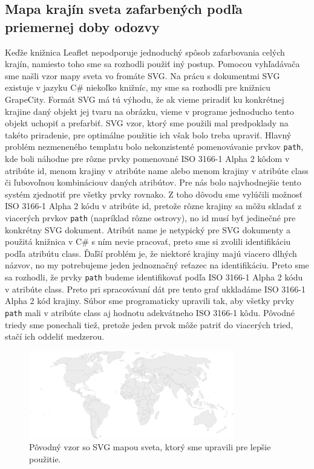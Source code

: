 \subsection{Mapa krajín sveta zafarbených podľa priemernej doby odozvy}
Keďže knižnica Leaflet nepodporuje jednoduchý spôsob zafarbovania celých krajín, namiesto toho sme sa rozhodli použiť iný postup. Pomocou vyhľadávača sme
našli vzor mapy sveta vo fromáte SVG. Na prácu s dokumentmi SVG existuje v jazyku C\# niekoľko knižníc, my sme sa rozhodli pre knižnicu GrapeCity. 
Formát SVG má tú výhodu, že ak vieme priradiť ku konkrétnej krajine daný objekt jej tvaru na obrázku, vieme v programe 
jednoducho tento objekt uchopiť a prefarbiť. SVG vzor, ktorý sme použili \cite{svg_mapa} mal predpoklady na takéto priradenie, pre optimálne použitie ich 
však bolo treba upraviť. Hlavný problém nezmeneného templatu bolo nekonzistenté pomenovávanie prvkov \lstinline{path}, kde boli náhodne pre rôzne prvky 
pomenované ISO 3166-1 Alpha 2 kôdom v atribúte id, menom krajiny v atribúte name alebo menom krajiny v atribúte class či ľubovoľnou kombináciouv daných atribútov. 
Pre nás bolo najvhodnejšie tento systém zjednotiť pre všetky prvky rovnako. Z toho dôvodu sme vylúčili možnosť ISO 3166-1 Alpha 2 kódu v atribúte id, pretože rôzne krajiny 
sa môžu skladať z viacerých prvkov \lstinline{path} (napríklad rôzne ostrovy), no id musí byť jedinečné pre konkrétny SVG dokument. Atribút name je netypický 
pre SVG dokumenty a použitá knižnica v C\# s ním nevie pracovať, preto sme si zvolili identifikáciu podľa atribútu class. Ďaľší problém je, že niektoré krajiny 
majú viacero dlhých názvov, no my potrebujeme jeden jednoznačný reťazec na identifikáciu. Preto sme sa rozhodli, že prvky \lstinline{path} budeme identifikovať 
podľa ISO 3166-1 Alpha 2 kódu v atribúte class. Preto pri spracovávaní dát pre tento graf ukkladáme ISO 3166-1 Alpha 2 kód krajiny. Súbor sme programaticky 
upravili tak, aby všetky prvky \lstinline{path} mali v atribúte class aj hodnotu adekvátneho ISO 3166-1 kôdu. Pôvodné triedy sme ponechali tiež, pretože jeden 
prvok môže patriť do viacerých tried, stačí ich oddeliť medzerou. 


\begin{figure}
    \centerline{\includegraphics[width=0.8\textwidth]{images/world}}
    \caption[Neupravený svg vzor]{Pôvodný vzor so SVG mapou sveta, ktorý sme upravili pre lepšie použitie. }
    \label{obr:world}
\end{figure}

